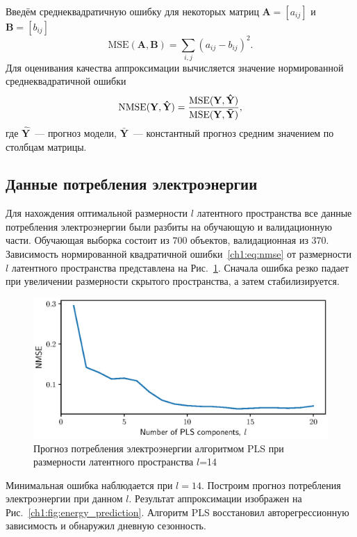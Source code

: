 Введём среднеквадратичную ошибку для некоторых матриц $\mathbf{A} = [a_{ij}]$ и $\mathbf{B} = [b_{ij}]$
\[
\text{MSE} (\mathbf{A}, \mathbf{B}) = \sum_{i,j} (a_{ij} - b_{ij})^2.
\]
Для оценивания качества аппроксимации вычисляется значение нормированной среднеквадратичной ошибки
\begin{equation}
\text{NMSE}(\mathbf{Y},  \mathbf{\hat{Y}}) = \frac{\text{MSE} (\mathbf{Y}, \mathbf{\hat{Y}})}{\text{MSE} (\mathbf{Y}, \mathbf{\bar{Y}})},
\label{ch1:eq:nmse}
\end{equation}
где $\mathbf{\hat{Y}}$~--- прогноз модели, $\mathbf{\bar{Y}}$~--- константный прогноз средним значением по столбцам матрицы.

\subsection*{Данные потребления электроэнергии}

Для нахождения оптимальной размерности $l$ латентного пространства все данные потребления электроэнергии были разбиты на обучающую и валидационную части. 
Обучающая выборка состоит из $700$ объектов, валидационная из $370$. Зависимость нормированной квадратичной ошибки~\eqref{ch1:eq:nmse} от размерности $l$ латентного пространства представлена на Рис.~\ref{ch1:fig:energy_n_comp}. 
Сначала ошибка резко падает при увеличении размерности скрытого пространства, а затем стабилизируется.

\begin{figure}[ht]
	\centering
	\includegraphics[width=0.75\linewidth]{figs/ch1/energy_n_comp}
	\caption{Прогноз потребления электроэнергии алгоритмом PLS при размерности латентного пространства $l$=14}
	\label{ch1:fig:energy_n_comp}
\end{figure}

Минимальная ошибка наблюдается при $l=14$. 
Построим прогноз потребления электроэнергии при данном $l$. 
Результат аппроксимации изображен на Рис.~\ref{ch1:fig:energy_prediction}. Алгоритм PLS восстановил авторегрессионную зависимость и обнаружил дневную сезонность.

